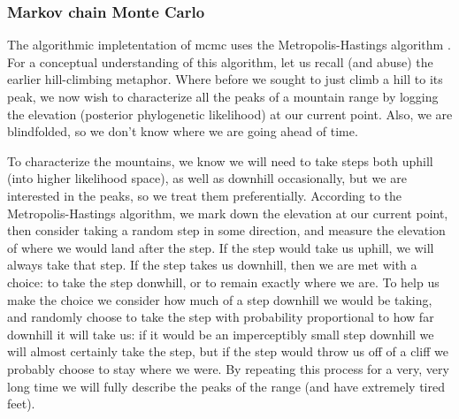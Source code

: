 \subsubsection{Markov chain Monte Carlo}
The algorithmic impletentation of \gls{mcmc} uses the Metropolis-Hastings algorithm \citep{metropolis1953equation,hastings1970monte}.
For a conceptual understanding of this algorithm, let us recall (and abuse) the earlier hill-climbing metaphor.
Where before we sought to just climb a hill to its peak, we now wish to characterize all the peaks of a mountain range by logging the elevation (posterior phylogenetic likelihood) at our current point.
Also, we are blindfolded, so we don't know where we are going ahead of time.

To characterize the mountains, we know we will need to take steps both uphill (into higher likelihood space), as well as downhill occasionally, but we are interested in the peaks, so we treat them preferentially.
According to the Metropolis-Hastings algorithm, we mark down the elevation at our current point, then consider taking a random step in some direction, and measure the elevation of where we would land after the step.
If the step would take us uphill, we will always take that step.
If the step takes us downhill, then we are met with a choice: to take the step donwhill, or to remain exactly where we are.
To help us make the choice we consider how much of a step downhill we would be taking, and randomly choose to take the step with probability proportional to how far downhill it will take us: if it would be an imperceptibly small step downhill we will almost certainly take the step, but if the step would throw us off of a cliff we probably choose to stay where we were.
By repeating this process for a very, very long time we will fully describe the peaks of the range (and have extremely tired feet).

